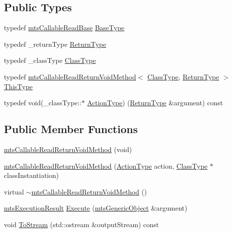 \subsection*{Public Types}
\begin{DoxyCompactItemize}
\item 
typedef \hyperlink{classmts_callable_read_base}{mts\+Callable\+Read\+Base} \hyperlink{classmts_callable_read_return_void_method_a9dbeaf2b51dba8323c5672945801307c}{Base\+Type}
\item 
typedef \+\_\+return\+Type \hyperlink{classmts_callable_read_return_void_method_a7a7034303bbcaa112a28d75dd0a576d2}{Return\+Type}
\item 
typedef \+\_\+class\+Type \hyperlink{classmts_callable_read_return_void_method_a694e26a4c7fc28f0c739aa2f2ab97e12}{Class\+Type}
\item 
typedef \hyperlink{classmts_callable_read_return_void_method}{mts\+Callable\+Read\+Return\+Void\+Method}$<$ \hyperlink{classmts_callable_read_return_void_method_a694e26a4c7fc28f0c739aa2f2ab97e12}{Class\+Type}, \hyperlink{classmts_callable_read_return_void_method_a7a7034303bbcaa112a28d75dd0a576d2}{Return\+Type} $>$ \hyperlink{classmts_callable_read_return_void_method_a118254e466e472246199228424a10737}{This\+Type}
\item 
typedef void(\+\_\+class\+Type\+::$\ast$ \hyperlink{classmts_callable_read_return_void_method_a97673cc9242251e406bde738cb060781}{Action\+Type}) (\hyperlink{classmts_callable_read_return_void_method_a7a7034303bbcaa112a28d75dd0a576d2}{Return\+Type} \&argument) const 
\end{DoxyCompactItemize}
\subsection*{Public Member Functions}
\begin{DoxyCompactItemize}
\item 
\hyperlink{classmts_callable_read_return_void_method_a80d3ca3aaf921033aa3f14dd6a366877}{mts\+Callable\+Read\+Return\+Void\+Method} (void)
\item 
\hyperlink{classmts_callable_read_return_void_method_aeafc533326dd26e92a87d16bea066205}{mts\+Callable\+Read\+Return\+Void\+Method} (\hyperlink{classmts_callable_read_return_void_method_a97673cc9242251e406bde738cb060781}{Action\+Type} action, \hyperlink{classmts_callable_read_return_void_method_a694e26a4c7fc28f0c739aa2f2ab97e12}{Class\+Type} $\ast$class\+Instantiation)
\item 
virtual \hyperlink{classmts_callable_read_return_void_method_a55a3d639bf248372bf6ab44663020236}{$\sim$mts\+Callable\+Read\+Return\+Void\+Method} ()
\item 
\hyperlink{classmts_execution_result}{mts\+Execution\+Result} \hyperlink{classmts_callable_read_return_void_method_a79de3217cc169c8d1a47e57234c6481b}{Execute} (\hyperlink{classmts_generic_object}{mts\+Generic\+Object} \&argument)
\item 
void \hyperlink{classmts_callable_read_return_void_method_a27a38456119252878ace309de008be50}{To\+Stream} (std\+::ostream \&output\+Stream) const 
\end{DoxyCompactItemize}
